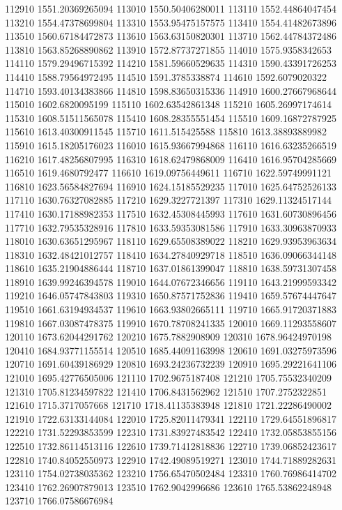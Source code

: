 {112910 1551.20369265094
113010 1550.50406280011
113110 1552.44864047454
113210 1554.47378699804
113310 1553.95475157575
113410 1554.41482673896
113510 1560.67184472873
113610 1563.63150820301
113710 1562.44784372486
113810 1563.85268890862
113910 1572.87737271855
114010 1575.9358342653
114110 1579.29496715392
114210 1581.59660529635
114310 1590.43391726253
114410 1588.79564972495
114510 1591.3785338874
114610 1592.6079020322
114710 1593.40134383866
114810 1598.83650315336
114910 1600.27667968644
115010 1602.6820095199
115110 1602.63542861348
115210 1605.26997174614
115310 1608.51511565078
115410 1608.28355551454
115510 1609.16872787925
115610 1613.40300911545
115710 1611.515425588
115810 1613.38893889982
115910 1615.18205176023
116010 1615.93667994868
116110 1616.63235266519
116210 1617.48256807995
116310 1618.62479868009
116410 1616.95704285669
116510 1619.4680792477
116610 1619.09756449611
116710 1622.59749991121
116810 1623.56584827694
116910 1624.15185529235
117010 1625.64752526133
117110 1630.76327082885
117210 1629.3227721397
117310 1629.11324517144
117410 1630.17188982353
117510 1632.45308445993
117610 1631.60730896456
117710 1632.79535328916
117810 1633.59353081586
117910 1633.30963870933
118010 1630.63651295967
118110 1629.65508389022
118210 1629.93953963634
118310 1632.48421012757
118410 1634.27840929718
118510 1636.09066344148
118610 1635.21904886444
118710 1637.01861399047
118810 1638.59731307458
118910 1639.99246394578
119010 1644.07672346656
119110 1643.21999593342
119210 1646.05747843803
119310 1650.87571752836
119410 1659.57674447647
119510 1661.63194934537
119610 1663.93802665111
119710 1665.91720371883
119810 1667.03087478375
119910 1670.78708241335
120010 1669.11293558607
120110 1673.62044291762
120210 1675.7882908909
120310 1678.96424970198
120410 1684.93771155514
120510 1685.44091163998
120610 1691.03275973596
120710 1691.60439186929
120810 1693.24236732239
120910 1695.29221641106
121010 1695.42776505006
121110 1702.9675187408
121210 1705.75532340209
121310 1705.81234597822
121410 1706.8431562962
121510 1707.2752322851
121610 1715.3717057668
121710 1718.41135383948
121810 1721.22286490002
121910 1722.63133144084
122010 1725.82011479341
122110 1729.64551896817
122210 1731.52293853599
122310 1731.83927483542
122410 1732.05853855156
122510 1732.86114513116
122610 1739.71412818836
122710 1739.06852423617
122810 1740.84052550973
122910 1742.49089519271
123010 1744.71889282631
123110 1754.02738035362
123210 1756.65470502484
123310 1760.76986414702
123410 1762.26907879013
123510 1762.9042996686
123610 1765.53862248948
123710 1766.07586676984
}

